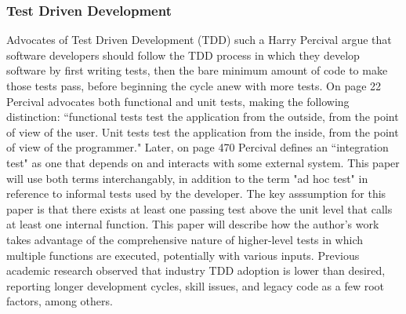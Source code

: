 \documentclass[10pt, conference]{IEEEtran}
\begin{document}
\subsubsection{Test Driven Development}\label{sec:intro-}
Advocates of Test Driven Development (TDD) such a Harry Percival
 \cite{percival2014test} argue that software developers should
follow the TDD process in which they develop software by first writing tests,
then the bare minimum amount of code to make those tests pass,
before beginning the cycle anew with more tests.
On page 22 \cite{percival2014test} Percival advocates both functional and
 unit tests, making the following distinction:
“functional tests test the application from the outside, from the point of view
of the user. Unit tests test the application from the inside,
from the point of view of the programmer."
Later, on page 470 \cite{percival2014test} Percival defines an “integration test" as
one that depends on and interacts with some external system.
This paper will use both terms interchangably, in addition to the term 
"ad hoc test" in reference to informal tests used by the developer.  
The key asssumption for this paper is that there exists at least one passing 
test above the unit level that calls at least one internal function.  This 
paper will describe how the author's work takes advantage of the 
comprehensive nature of higher-level tests in which multiple functions are 
executed, potentially with various inputs.
Previous academic research \cite{causevic2011factors, ramzan2024test} observed
 that industry TDD adoption is lower than desired,
reporting longer development cycles, skill issues, and legacy code as 
a few root factors, among others.
\end{document}
